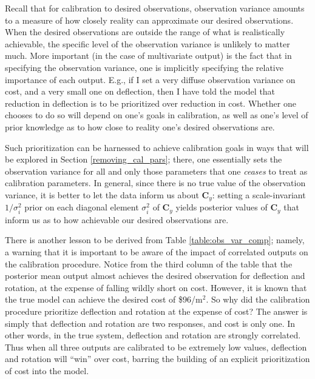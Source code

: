 \documentclass{article}
\begin{document}
Recall that for calibration to desired observations, observation variance amounts to a measure of how closely reality can approximate our desired observations. When the desired observations are outside the range of what is realistically achievable, the specific level of the observation variance is unlikely to matter much. More important (in the case of multivariate output) is the fact that in specifying the observation variance, one is implicitly specifying the relative importance of each output. E.g., if I set a very diffuse observation variance on cost, and a very small one on deflection, then I have told the model that reduction in deflection is to be prioritized over reduction in cost. Whether one chooses to do so will depend on one's goals in calibration, as well as one's level of prior knowledge as to how close to reality one's desired observations are.

Such prioritization can be harnessed to achieve calibration goals in ways that will be explored in Section \ref{removing_cal_pars}; there, one essentially sets the observation variance for all and only those parameters that one \emph{ceases} to treat as calibration parameters. In general, since there is no true value of the observation variance, it is better to let the data inform us about $\mathbf C_y$: setting a scale-invariant $1/\sigma_i^2$ prior on each diagonal element $\sigma_i^2$ of $\mathbf C_y$ yields posterior values of $\mathbf C_y$ that inform us as to how achievable our desired observations are.

There is another lesson to be derived from Table \ref{table:obs_var_comp}; namely, a warning that it is important to be aware of the impact of correlated outputs on the calibration procedure. Notice from the third column of the table that the posterior mean output almost achieves the desired observation for deflection and rotation, at the expense of falling wildly short on cost. However, it is known that the true model can achieve the desired cost of \$96/m$^2$. So why did the calibration procedure prioritize deflection and rotation at the expense of cost? The answer is simply that deflection and rotation are two responses, and cost is only one. In other words, in the true system, deflection and rotation are strongly correlated. Thus when all three outputs are calibrated to be extremely low values, deflection and rotation will ``win'' over cost, barring the building of an explicit prioritization of cost into the model. 
\end{document}
